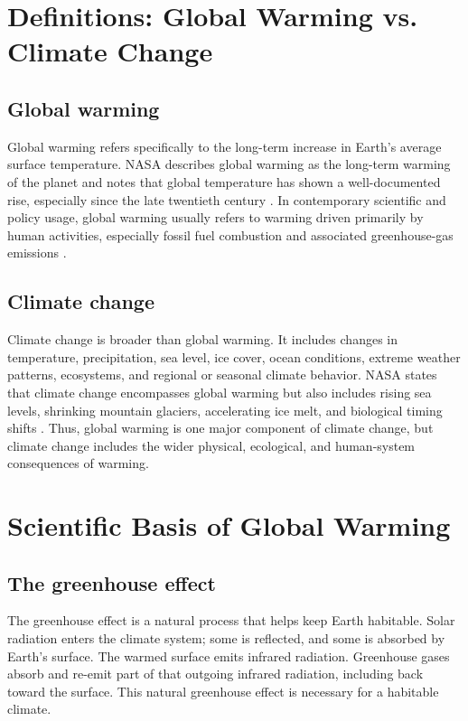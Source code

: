 \documentclass[12pt]{article}
\begin{document}
\section{Definitions: Global Warming vs. Climate Change}

\subsection{Global warming}

Global warming refers specifically to the long-term increase in Earth's average surface temperature. NASA describes global warming as the long-term warming of the planet and notes that global temperature has shown a well-documented rise, especially since the late twentieth century \cite{ref2}. In contemporary scientific and policy usage, global warming usually refers to warming driven primarily by human activities, especially fossil fuel combustion and associated greenhouse-gas emissions \cite{ref1,ref2}.

\subsection{Climate change}

Climate change is broader than global warming. It includes changes in temperature, precipitation, sea level, ice cover, ocean conditions, extreme weather patterns, ecosystems, and regional or seasonal climate behavior. NASA states that climate change encompasses global warming but also includes rising sea levels, shrinking mountain glaciers, accelerating ice melt, and biological timing shifts \cite{ref2}. Thus, global warming is one major component of climate change, but climate change includes the wider physical, ecological, and human-system consequences of warming.

\section{Scientific Basis of Global Warming}

\subsection{The greenhouse effect}

The greenhouse effect is a natural process that helps keep Earth habitable. Solar radiation enters the climate system; some is reflected, and some is absorbed by Earth's surface. The warmed surface emits infrared radiation. Greenhouse gases absorb and re-emit part of that outgoing infrared radiation, including back toward the surface. This natural greenhouse effect is necessary for a habitable climate.
\end{document}
